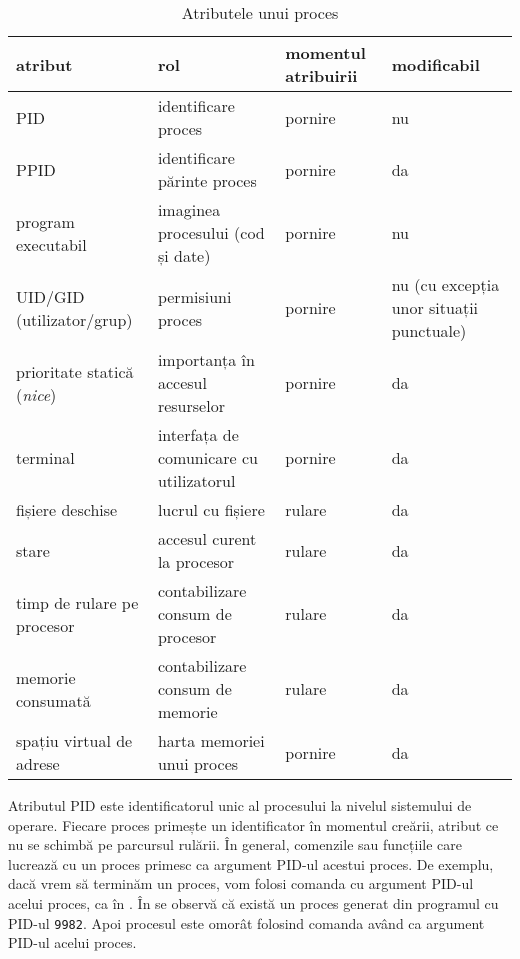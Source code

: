 \begin{table}[!htb]
\begin{center}
  \begin{tabular}{ p{} p{} p{} p{}  }
	\toprule
                \textbf{atribut} & \textbf{rol} & \textbf{momentul atribuirii} & \textbf{modificabil} \\
	\midrule
                PID & identificare proces & pornire & nu \\
	\midrule
                PPID & identificare părinte proces & pornire & da \\
	\midrule
                program executabil & imaginea procesului (cod și date) & pornire & nu \\
	\midrule
                UID/GID (utilizator/grup) & permisiuni proces & pornire & nu (cu excepția unor situații punctuale) \\
	\midrule
                prioritate statică (\textit{nice}) & importanța în accesul resurselor & pornire & da \\
        \midrule
                terminal & interfața de comunicare cu utilizatorul & pornire & da \\
        \midrule
                fișiere deschise & lucrul cu fișiere & rulare & da \\
        \midrule
                stare & accesul curent la procesor & rulare & da \\
        \midrule
                timp de rulare pe procesor & contabilizare consum de procesor & rulare & da \\
        \midrule
                memorie consumată & contabilizare consum de memorie & rulare & da \\
        \midrule
                spațiu virtual de adrese & harta memoriei unui proces & pornire & da \\
	\bottomrule
	\end{tabular}
\end{center}
\caption{Atributele unui proces}
\label{tab:process:attributes}
\end{table}

Atributul PID este identificatorul unic al procesului la nivelul sistemului de
operare. Fiecare proces primește un identificator în momentul creării, atribut
ce nu se schimbă pe parcursul rulării. În general, comenzile sau funcțiile care
lucrează cu un proces primesc ca argument PID-ul acestui proces. De exemplu,
dacă vrem să terminăm un proces, vom folosi comanda  cu argument PID-ul
acelui proces, ca în .
În  se observă că există un proces generat din programul  cu PID-ul \texttt{9982}. Apoi procesul este omorât folosind comanda  având ca argument PID-ul acelui proces.

